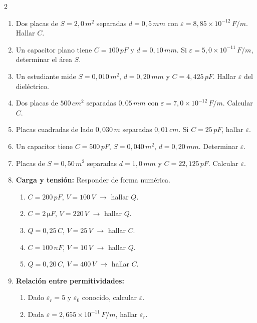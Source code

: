 \documentclass[a4paper,12pt]{article}
\begin{document}
\begin{multicols}{2}
\begin{enumerate}
\item Dos placas de \(S=2{,}0\,\si{m^2}\) separadas \(d=0{,}5\,\si{mm}\) con \(\varepsilon=8{,}85\times 10^{-12}\,\si{F/m}\). Hallar \(C\).

\item Un capacitor plano tiene \(C=100\,\si{pF}\) y \(d=0{,}10\,\si{mm}\). Si \(\varepsilon=5{,}0\times 10^{-11}\,\si{F/m}\), determinar el área \(S\).

\item Un estudiante mide \(S=0{,}010\,\si{m^2}\), \(d=0{,}20\,\si{mm}\) y \(C=4{,}425\,\si{pF}\). Hallar \(\varepsilon\) del dieléctrico.

\item Dos placas de \(500\,\si{cm^2}\) separadas \(0{,}05\,\si{mm}\) con \(\varepsilon=7{,}0\times 10^{-12}\,\si{F/m}\). Calcular \(C\).

\item Placas cuadradas de lado \(0{,}030\,\si{m}\) separadas \(0{,}01\,\si{cm}\). Si \(C=25\,\si{pF}\), hallar \(\varepsilon\).

\item Un capacitor tiene \(C=500\,\si{pF}\), \(S=0{,}040\,\si{m^2}\), \(d=0{,}20\,\si{mm}\). Determinar \(\varepsilon\).

\item Placas de \(S=0{,}50\,\si{m^2}\) separadas \(d=1{,}0\,\si{mm}\) y \(C=22{,}125\,\si{pF}\). Calcular \(\varepsilon\).

\item \textbf{Carga y tensión:} Responder de forma numérica.
\begin{enumerate}
\item \(C=200\,\si{pF}\), \(V=100\,\si{V}\) \(\rightarrow\) hallar \(Q\).
\item \(C=2\,\si{\micro F}\), \(V=220\,\si{V}\) \(\rightarrow\) hallar \(Q\).
\item \(Q=0{,}25\,\si{C}\), \(V=25\,\si{V}\) \(\rightarrow\) hallar \(C\).
\item \(C=100\,\si{nF}\), \(V=10\,\si{V}\) \(\rightarrow\) hallar \(Q\).
\item \(Q=0{,}20\,\si{C}\), \(V=400\,\si{V}\) \(\rightarrow\) hallar \(C\).
\end{enumerate}

\item \textbf{Relación entre permitividades:}
\begin{enumerate}
\item Dado \(\varepsilon_r=5\) y \(\varepsilon_0\) conocido, calcular \(\varepsilon\).
\item Dada \(\varepsilon=2{,}655\times 10^{-11}\,\si{F/m}\), hallar \(\varepsilon_r\).
\end{enumerate}

\end{enumerate}

\end{multicols}
\end{document}
